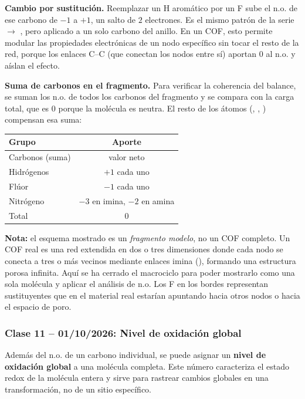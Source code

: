 \textbf{Cambio por sustitución.} Reemplazar un H aromático por un F 
sube el n.o. de ese carbono de $-1$ a $+1$, un salto de $2$ electrones. 
Es el mismo patrón de la serie  $\to$ , pero aplicado a 
un solo carbono del anillo. En un COF, esto permite modular las 
propiedades electrónicas de un nodo específico sin tocar el resto de la 
red, porque los enlaces C--C (que conectan los nodos entre sí) aportan 
$0$ al n.o. y aíslan el efecto.

\textbf{Suma de carbonos en el fragmento.} Para verificar la coherencia 
del balance, se suman los n.o. de todos los carbonos del fragmento y se 
compara con la carga total, que es $0$ porque la molécula es neutra. El 
resto de los átomos (, , ) compensan esa suma:

\begin{center}
\begin{tabular}{lc}
\hline
\textbf{Grupo} & \textbf{Aporte} \\
\hline
Carbonos (suma)   & valor neto \\
Hidrógenos        & $+1$ cada uno \\
Flúor             & $-1$ cada uno \\
Nitrógeno         & $-3$ en imina, $-2$ en amina \\
\hline
Total             & $0$ \\
\hline
\end{tabular}
\end{center}

\textbf{Nota:} el esquema mostrado es un \emph{fragmento modelo}, no un COF 
completo. Un COF real es una red extendida en dos o tres dimensiones donde 
cada nodo se conecta a tres o más vecinos mediante enlaces imina 
(), formando una estructura porosa infinita. Aquí se ha cerrado 
el macrociclo para poder mostrarlo como una sola molécula y aplicar el 
análisis de n.o. Los F en los bordes representan sustituyentes que en el 
material real estarían apuntando hacia otros nodos o hacia el espacio 
de poro.

{}
\subsubsection*{\textcolor{blueunam}{Clase 11 -- 01/10/2026: Nivel de oxidación global}}

Además del n.o. de un carbono individual, se puede asignar un 
\textbf{nivel de oxidación global} a una molécula completa. Este número 
caracteriza el estado redox de la molécula entera y sirve para rastrear 
cambios globales en una transformación, no de un sitio específico.

